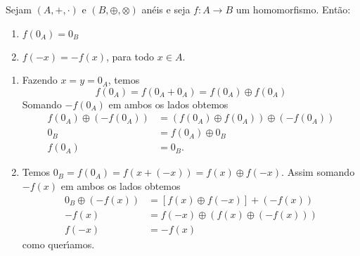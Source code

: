 \begin{proposicao}
	Sejam $(A, +, \cdot)$ e $(B, \oplus, \otimes)$ an\'eis e seja $f : A \to B$ um homomorfismo. Ent{\~a}o:
	\begin{enumerate}[label={\roman*})]
		\item $f(0_{A}) = 0_{B}$
		\item $f(-x) = -f(x)$, para todo $x \in A$.
	\end{enumerate}
\end{proposicao}
\begin{prova}
	\begin{enumerate}[label={\roman*})]
		\item Fazendo $x = y = 0_{A}$, temos
		\[
			f(0_A) = f(0_A + 0_A) = f(0_A) \oplus f(0_A)
		\]
		Somando $-f(0_A)$ em ambos os lados obtemos
		\begin{align*}
			f(0_A) \oplus (-f(0_A)) &= (f(0_A)\oplus f(0_A)) \oplus (-f(0_A))\\
			0_B &= f(0_A) \oplus 0_B\\
			f(0_A) &= 0_B.
		\end{align*}

		\item Temos $0_B = f(0_A) = f(x + (-x)) = f(x)\oplus f(-x)$. Assim somando $-f(x)$ em ambos os lados obtemos
		\begin{align*}
			0_B\oplus(-f(x)) &= [f(x)\oplus f(-x)] + (-f(x))\\
			-f(x) &= f(-x) \oplus (f(x) \oplus (-f(x)))\\
			f(-x) &= -f(x)
		\end{align*}
		como quer{\'\i}amos.
	\end{enumerate}
\end{prova}

